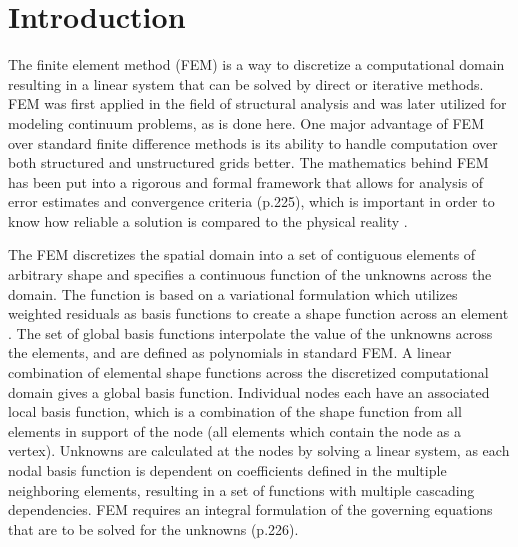 \documentclass[conf]{new-aiaa}
\begin{document}
\section{Introduction}
\bigskip

The finite element method (FEM) is a way to discretize a computational domain resulting in a linear system that can be solved by direct or iterative methods.  FEM was first applied in the field of structural analysis and was later utilized for modeling continuum problems, as is done here.  One major advantage of FEM over standard finite difference methods is its ability to handle computation over both structured and unstructured grids better.  The mathematics behind FEM has been put into a rigorous and formal framework that allows for analysis of error estimates and convergence criteria \cite{hirsch} (p.225), which is important in order to know how reliable a solution is compared to the physical reality .

The FEM discretizes the spatial domain into a set of contiguous elements of arbitrary shape and specifies a continuous function of the unknowns across the domain.  The function is based on a variational formulation which utilizes weighted residuals as basis functions to create a shape function across an element \cite{luo}.  The set of global basis functions interpolate the value of the unknowns across the elements, and are defined as polynomials in standard FEM.  A linear combination of elemental shape functions across the discretized computational domain gives a global basis function.  Individual nodes each have an associated local basis function, which is a combination of the shape function from all elements in support of the node (all elements which contain the node as a vertex).  Unknowns are calculated at the nodes by solving a linear system, as each nodal basis function is dependent on coefficients defined in the multiple neighboring elements, resulting in a set of functions with multiple cascading dependencies.  FEM requires an integral formulation of the governing equations that are to be solved for the unknowns \cite{hirsch} (p.226).
\end{document}
